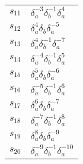 \documentclass{article}
\begin{document}
\begin{center}
\begin{tabular}{ll}
$s_{11}$ & $\delta_a^{-3}\delta_b^{-1}\delta_a^{4}$ \\
$s_{12}$ & $\delta_a^{4}\delta_b^{}\delta_a^{-5}$ \\
$s_{13}$ & $\delta_a^{4}\delta_b^{-1}\delta_a^{-7}$ \\
$s_{14}$ & $\delta_a^{-4}\delta_b^{-1}\delta_a^{5}$ \\
$s_{15}$ & $\delta_a^{5}\delta_b^{}\delta_a^{-6}$ \\
$s_{16}$ & $\delta_a^{-5}\delta_b^{-1}\delta_a^{6}$ \\
$s_{17}$ & $\delta_a^{6}\delta_b^{}\delta_a^{-7}$ \\
$s_{18}$ & $\delta_a^{-7}\delta_b^{-1}\delta_a^{8}$ \\
$s_{19}$ & $\delta_a^{8}\delta_b^{}\delta_a^{-9}$ \\
$s_{20}$ & $\delta_a^{-9}\delta_b^{-1}\delta_a^{-10}$ \\
\bottomrule
\end{tabular}
\end{center}

\thispagestyle{empty}
\end{document}
